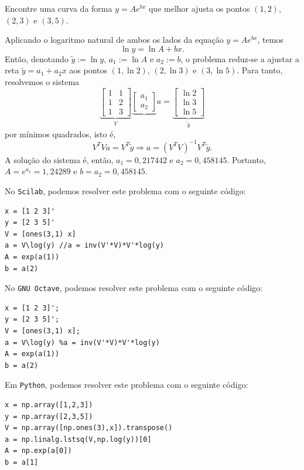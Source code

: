 \begin{ex}Encontre uma curva da forma $y=Ae^{bx}$ que melhor ajusta os pontos $(1, 2)$, $(2, 3)$ e $(3, 5)$.
\end{ex}
\begin{sol}
  Aplicando o logaritmo natural de ambos os lados da equação $y=Ae^{bx}$, temos
\begin{equation}
  \ln y = \ln A + bx.
\end{equation}
Então, denotando $\tilde{y} := \ln y$, $a_1 := \ln A$ e $a_2 := b$, o problema reduz-se a ajustar a reta $\tilde{y} = a_1 + a_2x$ aos pontos $(1, \ln 2)$, $(2, \ln 3)$ e $(3, \ln 5)$. Para tanto, resolvemos o sistema
\begin{equation}
  \underbrace{\begin{bmatrix}
    1 & 1\\
    1 & 2\\
    1 & 3
  \end{bmatrix}}_{V}
  \underbrace{\begin{bmatrix}
    a_1\\
    a_2
  \end{bmatrix}}{a} = 
  \underbrace{\begin{bmatrix}
    \ln 2\\
    \ln 3\\
    \ln 5
  \end{bmatrix}}_{\tilde{y}}
\end{equation}
por mínimos quadrados, isto é, 
\begin{equation}
 V^TVa = V^T\tilde{y} \Rightarrow a = \left(V^TV\right)^{-1}V^T\tilde{y}.
\end{equation}
A solução do sistema é, então, $a_1=0,217442$ e $a_2=0,458145$. Portanto, $A=e^{a_1}=1,24289$ e $b=a_2=0,458145$.

\ifisscilab
No \verb+Scilab+, podemos resolver este problema com o seguinte código:
\begin{verbatim}
x = [1 2 3]'
y = [2 3 5]'
V = [ones(3,1) x]
a = V\log(y) //a = inv(V'*V)*V'*log(y)
A = exp(a(1))
b = a(2)
\end{verbatim}
\fi
\ifisoctave
No \verb+GNU Octave+, podemos resolver este problema com o seguinte código:
\begin{verbatim}
x = [1 2 3]';
y = [2 3 5]';
V = [ones(3,1) x];
a = V\log(y) %a = inv(V'*V)*V'*log(y)
A = exp(a(1))
b = a(2)
\end{verbatim}
\fi
\ifispython
Em \verb+Python+, podemos resolver este problema com o seguinte código:
\begin{verbatim}
x = np.array([1,2,3])
y = np.array([2,3,5])
V = np.array([np.ones(3),x]).transpose()
a = np.linalg.lstsq(V,np.log(y))[0]
A = np.exp(a[0])
b = a[1]
\end{verbatim}
\fi
\end{sol}

